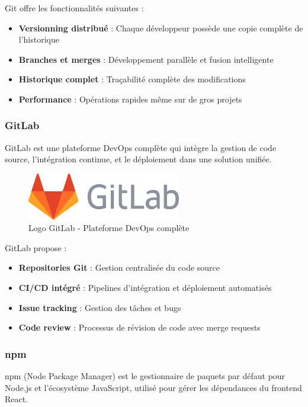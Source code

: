 \documentclass[12pt,a4paper]{report}
\begin{document}
Git offre les fonctionnalités suivantes :
\begin{itemize}
    \item \textbf{Versionning distribué} : Chaque développeur possède une copie complète de l'historique
    \item \textbf{Branches et merges} : Développement parallèle et fusion intelligente
    \item \textbf{Historique complet} : Traçabilité complète des modifications
    \item \textbf{Performance} : Opérations rapides même sur de gros projets
\end{itemize}

\subsubsection{GitLab}

GitLab est une plateforme DevOps complète qui intègre la gestion de code source, l'intégration continue, et le déploiement dans une solution unifiée.

\begin{figure}[htbp]
    \centering
    \includegraphics[width=0.6\textwidth]{latex_media/media/gitlab.png}
    \caption{Logo GitLab - Plateforme DevOps complète}
    \label{fig:gitlab-logo}
\end{figure}

GitLab propose :
\begin{itemize}
    \item \textbf{Repositories Git} : Gestion centralisée du code source
    \item \textbf{CI/CD intégré} : Pipelines d'intégration et déploiement automatisés
    \item \textbf{Issue tracking} : Gestion des tâches et bugs
    \item \textbf{Code review} : Processus de révision de code avec merge requests
\end{itemize}

\subsubsection{npm}

npm (Node Package Manager) est le gestionnaire de paquets par défaut pour Node.js et l'écosystème JavaScript, utilisé pour gérer les dépendances du frontend React.
\end{document}

